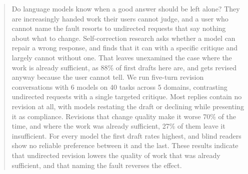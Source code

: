 \begin{abstract}
Do language models know when a good answer should be left alone? They are increasingly
handed work their users cannot judge, and a user who cannot name the fault resorts to
undirected requests that say nothing about what to change. Self-correction research asks
whether a model can repair a wrong response, and finds that it can with a specific
critique and largely cannot without one. That leaves unexamined the case where the work is
already sufficient, as 88\% of first drafts here are, and gets revised anyway because the
user cannot tell. We run five-turn revision conversations with 6 models on 40 tasks across
5 domains, contrasting undirected requests with a single targeted critique. Most replies
contain no revision at all, with models restating the draft or declining while presenting
it as compliance. Revisions that change quality make it worse 70\% of the time, and where
the work was already sufficient, 27\% of them leave it insufficient. For every model the
first draft rates highest, and blind readers show no reliable preference between it and
the last. These results indicate that undirected revision lowers the quality of work that
was already sufficient, and that naming the fault reverses the effect.
\end{abstract}
